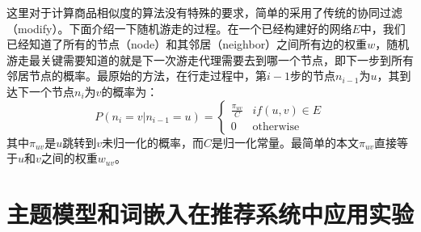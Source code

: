 这里对于计算商品相似度的算法没有特殊的要求，简单的采用了传统的协同过滤（modify）。下面介绍一下随机游走的过程。在一个已经构建好的网络$E$中，我们已经知道了所有的节点（node）和其邻居（neighbor）之间所有边的权重$w$，随机游走最关键需要知道的就是下一次游走代理需要去到哪一个节点，即下一步到所有邻居节点的概率。最原始的方法，在行走过程中，第$i-1$步的节点$n_{i-1}$为$u$，其到达下一个节点$n_i$为$v$的概率为：
\begin{equation}
P(n_i = v|n_{i-1} = u) = 
\begin{cases}
\frac{\pi_{uv}}{C} &if (u,v) \in E\\
0 &\mbox{otherwise}
\end{cases}
\end{equation}
其中$\pi_{uv}$是$u$跳转到$v$未归一化的概率，而$C$是归一化常量。最简单的本文$\pi_{uv}$直接等于$u$和$v$之间的权重$w_{uv}$。
\section{主题模型和词嵌入在推荐系统中应用实验}

\ifx\usechapbib\empty
\nocite{BSTcontrol}
\setcounter{NAT@ctr}{0}


\fi

